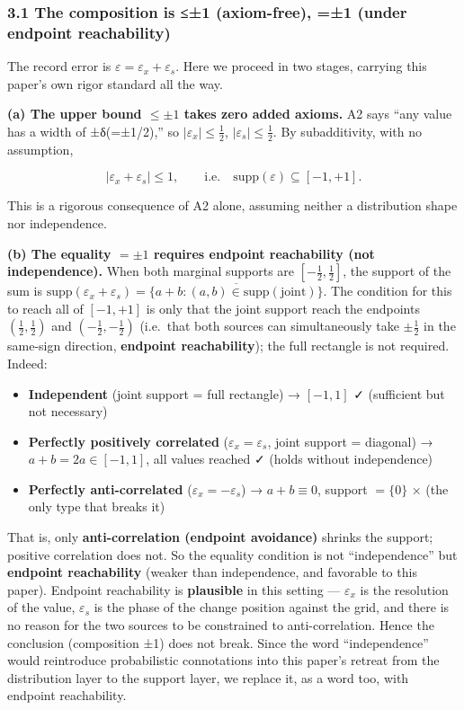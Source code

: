 \documentclass[
]{ltjsarticle}
\providecommand{\tightlist}{%
  \setlength{\itemsep}{0pt}\setlength{\parskip}{0pt}}
\begin{document}
\subsubsection{3.1 The composition is ≤±1 (axiom-free), =±1 (under
endpoint
reachability)}\label{the-composition-is-1-axiom-free-1-under-endpoint-reachability}

The record error is \(\varepsilon=\varepsilon_x+\varepsilon_s\). Here we
proceed in two stages, carrying this paper's own rigor standard all the
way.

\textbf{(a) The upper bound \(\le\pm1\) takes zero added axioms.} A2
says ``any value has a width of ±δ(=±1/2),'' so
\(|\varepsilon_x|\le\tfrac12\), \(|\varepsilon_s|\le\tfrac12\). By
subadditivity, with no assumption,

\[
|\varepsilon_x+\varepsilon_s|\le 1,\qquad\text{i.e.}\quad \mathrm{supp}(\varepsilon)\subseteq[-1,+1].
\]

This is a rigorous consequence of A2 alone, assuming neither a
distribution shape nor independence.

\textbf{(b) The equality \(=\pm1\) requires endpoint reachability (not
independence).} When both marginal supports are
\([-\tfrac12,\tfrac12]\), the support of the sum is
\(\mathrm{supp}(\varepsilon_x+\varepsilon_s)=\overline{\{a+b:(a,b)\in\mathrm{supp(joint)}\}}\).
The condition for this to reach all of \([-1,+1]\) is only that the
joint support reach the endpoints \((\tfrac12,\tfrac12)\) and
\((-\tfrac12,-\tfrac12)\) (i.e.~that both sources can simultaneously
take \(\pm\tfrac12\) in the same-sign direction, \textbf{endpoint
reachability}); the full rectangle is not required. Indeed:

\begin{itemize}
\tightlist
\item
  \textbf{Independent} (joint support = full rectangle) → \([-1,1]\) ✓
  (sufficient but not necessary)
\item
  \textbf{Perfectly positively correlated}
  (\(\varepsilon_x=\varepsilon_s\), joint support = diagonal) →
  \(a+b=2a\in[-1,1]\), all values reached ✓ (holds without independence)
\item
  \textbf{Perfectly anti-correlated} (\(\varepsilon_x=-\varepsilon_s\))
  → \(a+b\equiv0\), support \(=\{0\}\) × (the only type that breaks it)
\end{itemize}

That is, only \textbf{anti-correlation (endpoint avoidance)} shrinks the
support; positive correlation does not. So the equality condition is not
``independence'' but \textbf{endpoint reachability} (weaker than
independence, and favorable to this paper). Endpoint reachability is
\textbf{plausible} in this setting --- \(\varepsilon_x\) is the
resolution of the value, \(\varepsilon_s\) is the phase of the change
position against the grid, and there is no reason for the two sources to
be constrained to anti-correlation. Hence the conclusion (composition
±1) does not break. Since the word ``independence'' would reintroduce
probabilistic connotations into this paper's retreat from the
distribution layer to the support layer, we replace it, as a word too,
with endpoint reachability.
\end{document}
